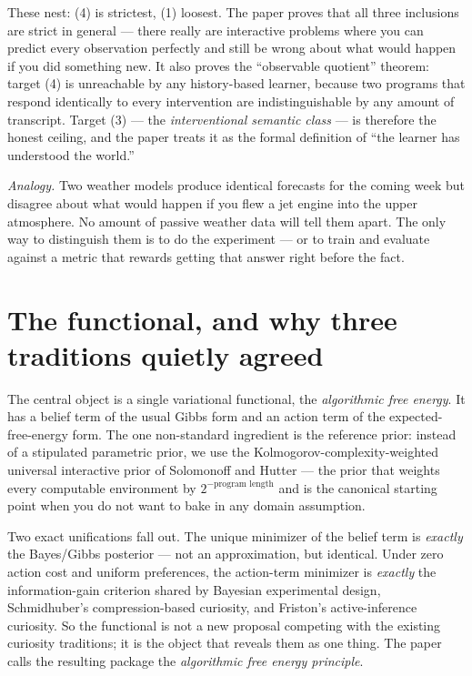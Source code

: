 \documentclass[11pt]{article}
\begin{document}
These nest: (4) is strictest, (1) loosest. The paper proves that all three inclusions are strict in general --- there really are interactive problems where you can predict every observation perfectly and still be wrong about what would happen if you did something new. It also proves the ``observable quotient'' theorem: target (4) is unreachable by any history-based learner, because two programs that respond identically to every intervention are indistinguishable by any amount of transcript. Target (3) --- the \emph{interventional semantic class} --- is therefore the honest ceiling, and the paper treats it as the formal definition of ``the learner has understood the world.''

\emph{Analogy.} Two weather models produce identical forecasts for the coming week but disagree about what would happen if you flew a jet engine into the upper atmosphere. No amount of passive weather data will tell them apart. The only way to distinguish them is to do the experiment --- or to train and evaluate against a metric that rewards getting that answer right before the fact.

\section*{The functional, and why three traditions quietly agreed}

The central object is a single variational functional, the \emph{algorithmic free energy}. It has a belief term of the usual Gibbs form and an action term of the expected-free-energy form. The one non-standard ingredient is the reference prior: instead of a stipulated parametric prior, we use the Kolmogorov-complexity-weighted universal interactive prior of Solomonoff and Hutter --- the prior that weights every computable environment by $2^{-\text{program length}}$ and is the canonical starting point when you do not want to bake in any domain assumption.

Two exact unifications fall out. The unique minimizer of the belief term is \emph{exactly} the Bayes/Gibbs posterior --- not an approximation, but identical. Under zero action cost and uniform preferences, the action-term minimizer is \emph{exactly} the information-gain criterion shared by Bayesian experimental design, Schmidhuber's compression-based curiosity, and Friston's active-inference curiosity. So the functional is not a new proposal competing with the existing curiosity traditions; it is the object that reveals them as one thing. The paper calls the resulting package the \emph{algorithmic free energy principle}.
\end{document}
